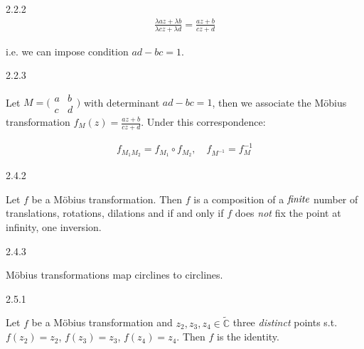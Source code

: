 \documentclass[10pt,landscape]{article}
\begin{document}
\begin{multicols}{3}
\begin{remark}{2.2.2}{}
        \begin{align*}
            \frac{\lambda a z + \lambda b}{\lambda c z + \lambda d} = \frac{az + b}{cz + d}
        \end{align*}

    i.e. we can impose condition $ad - bc = 1$.

\end{remark}

\begin{lemma}{2.2.3}{}

    Let $M = \bigl( \begin{smallmatrix} a & b \\ c & d \end{smallmatrix} \bigr)$ with determinant $ad - bc = 1$, then we associate the Möbius transformation $f_M(z) = \frac{az + b}{cz + d}$. Under this correspondence:

        \begin{align*}
            f_{M_1M_2} = f_{M_1} \circ f_{M_2}, \quad f_{M^{-1}} = f_M^{-1}
        \end{align*}

\end{lemma}

\begin{theorem}{2.4.2}{}

    Let $f$ be a Möbius transformation. Then $f$ is a composition of a $\emph{finite}$ number of translations, rotations, dilations and if and only if $f$ does \emph{not} fix the point at infinity, one inversion.

\end{theorem}

\begin{corollary}{2.4.3}{}

     Möbius transformations map circlines to circlines.

\end{corollary}

\begin{lemma}{2.5.1}{}

    Let $f$ be a Möbius transformation and $z_2, z_3, z_4 \in \tilde{\mathbb{C}}$ three \emph{distinct} points s.t. $f(z_2)=z_2$, $f(z_3)=z_3$, $f(z_4)=z_4$. Then $f$ is the identity.

\end{lemma}


\end{multicols}
\end{document}
